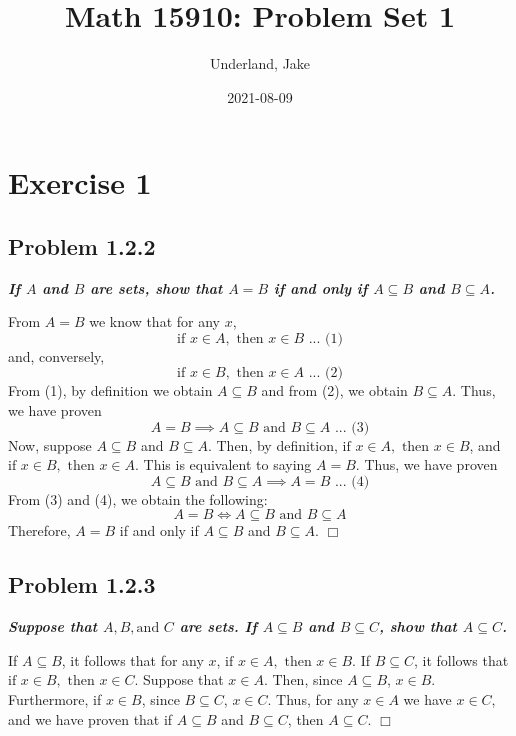 \documentclass[
]{article}
\title{Math 15910: Problem Set 1}
\author{Underland, Jake}
\date{2021-08-09}
\begin{document}
\maketitle

{
\setcounter{tocdepth}{2}
\tableofcontents
}
\hypertarget{exercise-1}{%
\section{Exercise 1}\label{exercise-1}}

\hypertarget{problem-1.2.2}{%
\subsection{Problem 1.2.2}\label{problem-1.2.2}}

\textbf{\emph{If \(A\) and \(B\) are sets, show that \(A = B\) if and
only if \(A \subseteq B\) and \(B \subseteq A\).}}

From \(A=B\) we know that for any \(x\),
\[\text{if } x \in A, \text{ then } x \in B \text{ ... (1)}\] and,
conversely,
\[\text{if } x \in B, \text{ then } x \in A \text{ ... (2)}\] From (1),
by definition we obtain \(A \subseteq B\) and from (2), we obtain
\(B \subseteq A\). Thus, we have proven
\[ A = B \implies A \subseteq B \text{ and }B \subseteq A \text{ ... (3)}\]
Now, suppose \(A \subseteq B\) and \(B \subseteq A\). Then, by
definition, \(\text{if } x \in A, \text{ then } x \in B\), and
\(\text{if } x \in B, \text{ then } x \in A\). This is equivalent to
saying \(A = B\). Thus, we have proven
\[A \subseteq B \text{ and }B \subseteq A \implies A = B  \text{ ... (4)}\]
From (3) and (4), we obtain the following:
\[ A = B \iff A \subseteq B \text{ and }B \subseteq A \] Therefore,
\(A = B\) if and only if \(A \subseteq B\) and \(B \subseteq A\).
\hfill \(\Box\)

\hypertarget{problem-1.2.3}{%
\subsection{Problem 1.2.3}\label{problem-1.2.3}}

\textbf{\emph{Suppose that \(A, B, \text{and } C\) are sets. If
\(A \subseteq B\) and \(B\subseteq C\), show that \(A \subseteq C\).}}

If \(A \subseteq B\), it follows that for any \(x\),
\(\text{if } x \in A, \text{ then } x \in B\). If \(B \subseteq C\), it
follows that \(\text{if } x \in B, \text{ then } x \in C\). Suppose that
\(x \in A\). Then, since \(A \subseteq B\), \(x \in B\). Furthermore, if
\(x \in B\), since \(B \subseteq C\), \(x \in C\). Thus, for any
\(x \in A\) we have \(x \in C\), and we have proven that if
\(A \subseteq B\) and \(B\subseteq C\), then \(A \subseteq C\).
\hfill \(\Box\)
\end{document}
